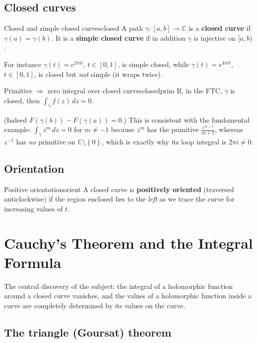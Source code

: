 \documentclass[11pt,openany]{report}
\newcommand{\C}{\mathbb{C}}
\newcommand{\set}[1]{\left\{ #1 \right\}}
\begin{document}
\section{Closed curves}

\begin{definition}{Closed and simple closed curves}{closed}
A path $\gamma:[a,b]\to\C$ is a \textbf{closed curve} if $\gamma(a)=\gamma(b)$. It is a
\textbf{simple closed curve} if in addition $\gamma$ is injective on $[a,b)$.
\end{definition}
For instance $\gamma(t)=e^{2\pi i t}$, $t\in[0,1]$, is simple closed, while
$\gamma(t)=e^{4\pi i t}$, $t\in[0,1]$, is closed but \emph{not} simple (it wraps twice).

\begin{corollary}{Primitive $\Rightarrow$ zero integral over closed curves}{closedprim}
If, in the FTC, $\gamma$ is closed, then $\displaystyle\int_\gamma f(z)\,dz = 0$.
\end{corollary}
(Indeed $F(\gamma(b))-F(\gamma(a))=0$.) This is consistent with the fundamental example:
$\int_\gamma z^m\,dz = 0$ for $m\ne-1$ because $z^m$ has the primitive
$\frac{z^{m+1}}{m+1}$, whereas $z^{-1}$ has \emph{no} primitive on $\C\setminus\set0$,
which is exactly why its loop integral is $2\pi i\ne0$.

\section{Orientation}

\begin{definition}{Positive orientation}{orient}
A closed curve is \textbf{positively oriented} (traversed anticlockwise) if the region
enclosed lies to the \emph{left} as we trace the curve for increasing values of $t$.
\end{definition}


\chapter{Cauchy's Theorem and the Integral Formula}

The central discovery of the subject: the integral of a holomorphic function around a
closed curve vanishes, and the values of a holomorphic function inside a curve are
completely determined by its values on the curve.

\section{The triangle (Goursat) theorem}
\end{document}
